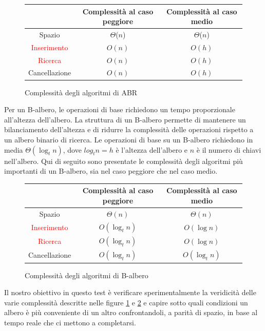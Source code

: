 \begin{figure}[H]
    \centering
    \begin{tabular}{|c|c|c|}
        \hline
         & Complessità al caso peggiore & Complessità al caso medio\\
        \hline
        Spazio & $\Theta$($n$) & $\Theta$($n$)\\
        \hline
        \textcolor{red}{Inserimento} & $O(n)$ & $O(h)$\\
        \hline
        \textcolor{red}{Ricerca} & $O(n)$ & $O(h)$\\
        \hline
        Cancellazione & $O(n)$ & $O(h)$\\
        \hline
    \end{tabular}
    \caption{Complessità degli algoritmi di ABR}
    \label{fig:ComplessitàABR}
\end{figure}

Per un B-albero, le operazioni di base richiedono un tempo proporzionale all'altezza dell'albero. La struttura di un B-albero permette di mantenere un bilanciamento dell'altezza e di ridurre la complessità delle operazioni rispetto a un albero binario di ricerca. Le operazioni di base su un B-albero richiedono in media \(\Theta(\log_t n)\), dove \(log_tn=h\) è l'altezza dell'albero e \(n\) è il numero di chiavi nell'albero. Qui di seguito sono presentate le complessità degli algoritmi più importanti di un B-albero, sia nel caso peggiore che nel caso medio.

\begin{figure}[H]
    \centering
    \begin{tabular}{|c|c|c|}
        \hline
         & Complessità al caso peggiore & Complessità al caso medio\\
        \hline
        Spazio & \(\Theta(n)\) & \(\Theta(n)\)\\
        \hline
        \textcolor{red}{Inserimento} & \(O(\log_t n)\) & \(O(\log n)\)\\
        \hline
        \textcolor{red}{Ricerca} & \(O(\log_t n)\) & \(O(\log n)\)\\
        \hline
        Cancellazione & \(O(\log_t n)\) & \(O(\log_t n)\)\\
        \hline
    \end{tabular}
    \caption{Complessità degli algoritmi di B-albero}
    \label{fig:ComplessitàBA}
\end{figure}


Il nostro obiettivo in questo test è verificare sperimentalmente la veridicità delle varie complessità descritte nelle figure \ref{fig:ComplessitàABR} e \ref{fig:ComplessitàBA} e capire sotto quali condizioni un albero è più conveniente di un altro confrontandoli, a parità di spazio, in base al tempo reale che ci mettono a completarsi.





